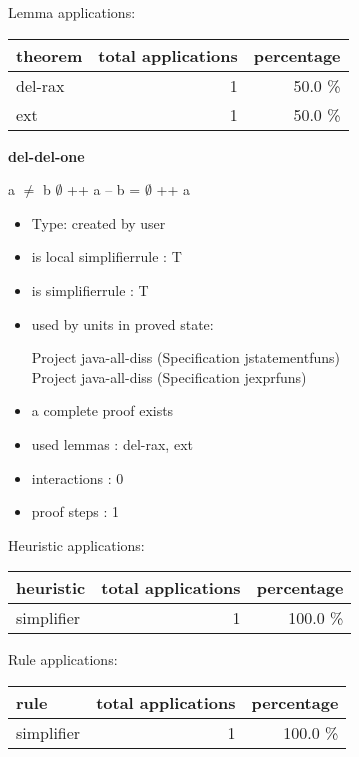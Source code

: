 \documentclass[a4paper]{article}
\begin{document}
Lemma applications:

\begin{supertabular}{l|r|r}
theorem	        & total applications & percentage \\ \hline
del-rax & 1 & 50.0 \% \\
ext & 1 & 50.0 \% \\

\end{supertabular}
\pagebreak

{\LARGE\bf del-del-one}\label{lemma-del-del-one}

\medskip

 \Fol a $\neq$ b \Imp $\emptyset$ ++ a -- b = $\emptyset$ ++ a

\begin{itemize}

\item Type: created by user

\item is local simplifierrule : T
\item is simplifierrule : T
\item used by units in proved state:

Project java-all-diss (Specification jstatementfuns) \\
Project java-all-diss (Specification jexprfuns)
\item       a complete proof exists
\item       used lemmas  : del-rax, ext
\item       interactions : 0
\item       proof steps  : 1
\end{itemize}

\medskip


Heuristic applications:

\begin{supertabular}{l|r|r}
heuristic	& total applications & percentage \\ \hline
simplifier & 1 & 100.0 \% \\

\end{supertabular}

Rule applications:

\begin{supertabular}{l|r|r}
rule	        & total applications & percentage \\ \hline
simplifier & 1 & 100.0 \% \\

\end{supertabular}
\end{document}
